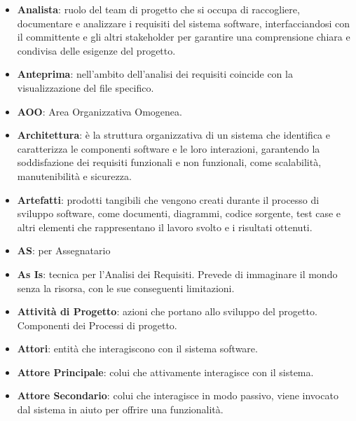 \documentclass[a4paper,12pt]{article}
\begin{document}
\begin{itemize}
    \item \textbf{Analista}: ruolo del team di progetto che si occupa di raccogliere, documentare e analizzare i requisiti del sistema software, interfacciandosi con il committente e gli altri stakeholder per garantire una comprensione chiara e condivisa delle esigenze del progetto.
    \item \textbf{Anteprima}: nell'ambito dell'analisi dei requisiti coincide con la visualizzazione del file specifico.
    \item \textbf{AOO}: Area Organizzativa Omogenea.
    \item \textbf{Architettura}: è la struttura organizzativa di un sistema che identifica e caratterizza le componenti software e le loro interazioni, garantendo la soddisfazione dei requisiti funzionali e non funzionali, come scalabilità, manutenibilità e sicurezza.
    \item \textbf{Artefatti}: prodotti tangibili che vengono creati durante il processo di sviluppo software, come documenti, diagrammi, codice sorgente, test case e altri elementi che rappresentano il lavoro svolto e i risultati ottenuti.
    \item \textbf{AS}: per Assegnatario
    \item \textbf{As Is}: tecnica per l'Analisi dei Requisiti. Prevede di immaginare il mondo senza la risorsa, con le sue conseguenti limitazioni.
    \item \textbf{Attività di Progetto}: azioni che portano allo sviluppo del progetto. Componenti dei Processi di progetto.
    \item \textbf{Attori}: entità che interagiscono con il sistema software.
    \item \textbf{Attore Principale}: colui che attivamente interagisce con il sistema.
    \item \textbf{Attore Secondario}: colui che interagisce in modo passivo, viene invocato dal sistema in aiuto per offrire una funzionalità.
\end{itemize}
\end{document}

